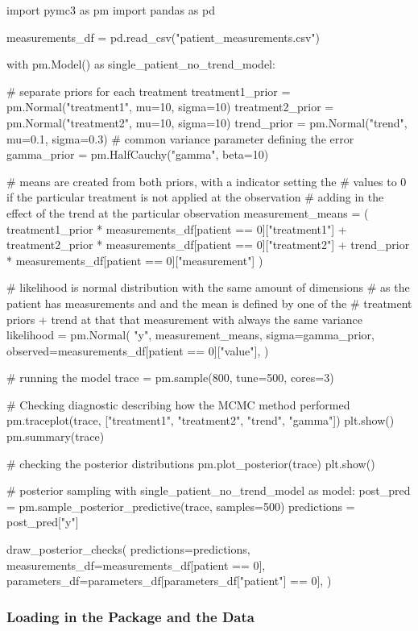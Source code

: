 \documentclass[12pt,a4paper,leqno]{report}
\theoremstyle{plain}
\theoremstyle{definition}
\theoremstyle{remark}
\begin{document}
\begin{pyverbatim}
import pymc3 as pm
import pandas as pd

measurements_df = pd.read_csv("patient_measurements.csv")
   
with pm.Model() as single_patient_no_trend_model:

    # separate priors for each treatment
    treatment1_prior = pm.Normal("treatment1", mu=10, sigma=10)
    treatment2_prior = pm.Normal("treatment2", mu=10, sigma=10)
    trend_prior = pm.Normal("trend", mu=0.1, sigma=0.3)
    # common variance parameter defining the error
    gamma_prior = pm.HalfCauchy("gamma", beta=10)

    # means are created from both priors, with a indicator setting the
    # values to 0 if the particular treatment is not applied at the observation
    # adding in the effect of the trend at the particular observation
    measurement_means = (
        treatment1_prior * measurements_df[patient == 0]["treatment1"]
        + treatment2_prior * measurements_df[patient == 0]["treatment2"]
        + trend_prior * measurements_df[patient == 0]["measurement"]
    )

    # likelihood is normal distribution with the same amount of dimensions
    # as the patient has measurements and and the mean is defined by one of the
    # treatment priors + trend at that that measurement with always the same variance
    likelihood = pm.Normal(
        "y",
        measurement_means,
        sigma=gamma_prior,
        observed=measurements_df[patient == 0]["value"],
    )

    # running the model
    trace = pm.sample(800, tune=500, cores=3)

    # Checking diagnostic describing how the MCMC method performed
    pm.traceplot(trace, ["treatment1", "treatment2", "trend", "gamma"])
    plt.show()
    pm.summary(trace)

    # checking the posterior distributions
    pm.plot_posterior(trace)
    plt.show()

 
# posterior sampling
with single_patient_no_trend_model as model:
    post_pred = pm.sample_posterior_predictive(trace, samples=500)
    predictions = post_pred["y"]

draw_posterior_checks(
    predictions=predictions,
    measurements_df=measurements_df[patient == 0],
    parameters_df=parameters_df[parameters_df["patient"] == 0],
)
\end{pyverbatim}

\subsubsection{Loading in the Package and the Data}
\end{document}
